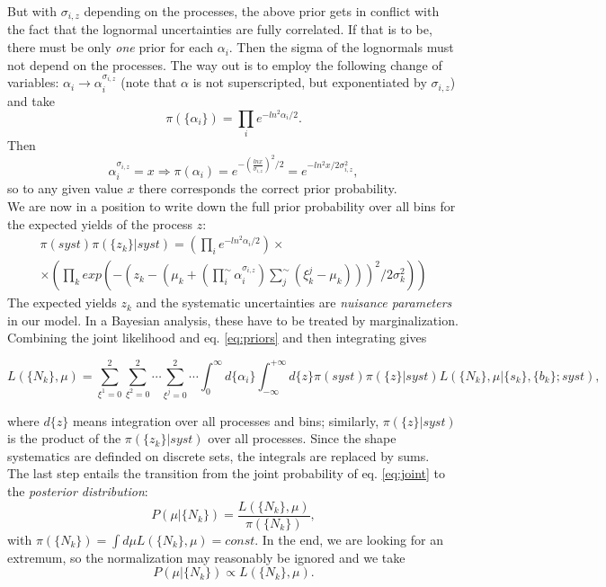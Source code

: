 \documentclass[aps,prb,twocolumn,showpacs,superscriptaddress,groupedaddress]{revtex4}  %
\begin{document}
But with $\sigma_{i,z}$ depending on the processes, the above prior gets in conflict with the fact that the lognormal uncertainties are fully correlated. If that is to be, there must be only \emph{one} prior for each $\alpha_{i}$. Then the sigma of the lognormals must not depend on the processes. The way out is to employ the following change of variables: $\alpha_{i}\to\alpha_{i}^{\sigma_{i,z}}$ (note that $\alpha$ is not superscripted, but exponentiated by $\sigma_{i,z}$) and take
\begin{equation*}
\pi(\{\alpha_{i}\})=\prod\limits_{i}e^{-ln^{2}\alpha_{i}/2}.
\end{equation*}
Then
\begin{equation*}
\alpha_{i}^{\sigma_{i,z}}=x \Rightarrow \pi(\alpha_{i})=e^{-(\frac{ln x}{\sigma_{i,z}})^{2}/2}=e^{-ln^{2}x/2\sigma_{i,z}^{2}},
\end{equation*}
so to any given value $x$ there corresponds the correct prior probability.\\ 
We are now in a position to write down the full prior probability over all bins for the expected yields of the process $z$:
\begin{equation}\label{eq:priors}
\begin{split}
\pi(syst)\pi(\{z_{k}\}|syst)=(\prod\limits_{i}e^{-ln^{2}\alpha_{i}/2})\times\\
\times(\prod\limits_{k}exp(-(z_{k}-(\mu_{k}+(\prod\limits_{i}^{\sim}\alpha_{i}^{\sigma_{i,z}})\sum\limits_{j}^{\sim}(\xi_{k}^{j}-\mu_{k})))^{2}/2\sigma_{k}^{2}))
\end{split}
\end{equation}
The expected yields $z_{k}$ and the systematic uncertainties are \emph{nuisance parameters} in our model. In a Bayesian analysis, these have to be treated by marginalization. Combining the joint likelihood and eq. \ref{eq:priors} and then integrating gives
\begin{widetext}
\begin{equation}\label{eq:joint}
L(\{N_{k}\},\mu)=\sum\limits_{\xi^{1}=0}^{2}\sum\limits_{\xi^{2}=0}^{2}\dotsi\sum\limits_{\xi^{j}=0}^{2}\dotsi \int_{0}^{\infty}d\{\alpha_{i}\}\int_{-\infty}^{+\infty} d\{z\}\pi(syst)\pi(\{z\}|syst)L(\{N_{k}\},\mu|\{s_{k}\},\{b_{k}\};syst),
\end{equation}
\end{widetext}
where $d\{z\}$ means integration over all processes and bins; similarly, $\pi(\{z\}|syst)$ is the product of the $\pi(\{z_{k}\}|syst)$ over all processes. Since the shape systematics are definded on discrete sets, the integrals are replaced by sums.\\
The last step entails the transition from the joint probability of eq. \ref{eq:joint} to the \emph{posterior distribution}:
\begin{equation}
P(\mu|\{N_{k}\})=\frac{L(\{N_{k}\},\mu)}{\pi(\{N_{k}\})},
\end{equation}
with $\pi(\{N_{k}\})=\int d\mu L(\{N_{k}\},\mu)=const$. In the end, we are looking for an extremum, so the normalization may reasonably be ignored and we take
\begin{equation}
P(\mu|\{N_{k}\}) \propto L(\{N_{k}\},\mu).
\end{equation}
\end{document}
